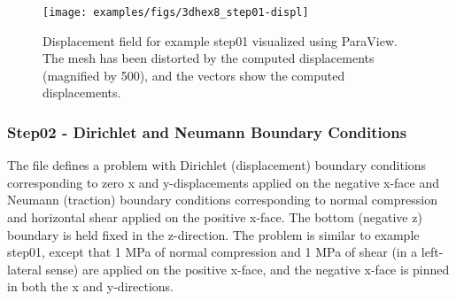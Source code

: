 \begin{figure}
  \texttt{[image: examples/figs/3dhex8\_step01-displ]}
  \caption{Displacement field for example step01 visualized using ParaView. The
    mesh has been distorted by the computed displacements (magnified by
    500), and the vectors show the computed displacements.}
  \label{fig:example:3dhex8:step01:displacement}
\end{figure}


\subsubsection{Step02 - Dirichlet and Neumann Boundary Conditions}

The  file defines a problem with Dirichlet (displacement)
boundary conditions corresponding to zero x and y-displacements applied
on the negative x-face and Neumann (traction) boundary conditions
corresponding to normal compression and horizontal shear applied on
the positive x-face. The bottom (negative z) boundary is held fixed
in the z-direction. The problem is similar to example step01, except
that 1 MPa of normal compression and 1 MPa of shear (in a left-lateral
sense) are applied on the positive x-face, and the negative x-face
is pinned in both the x and y-directions.


